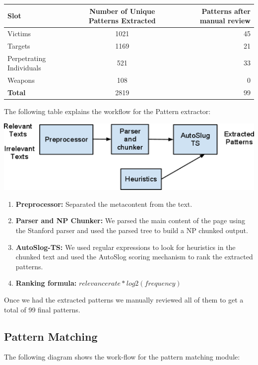\documentclass[11pt]{myclass}
\begin{document}
\begin{tabular}{| l | c | r |}
  \hline
  \textbf{Slot} & \textbf{Number of Unique Patterns Extracted} & \textbf{Patterns after manual review} \\
  \hline
  Victims & 1021 & 45 \\
  \hline
  Targets & 1169 & 21 \\
  \hline
  Perpetrating Individuals & 521 & 33 \\
  \hline
  Weapons & 108 & 0 \\
  \hline
  \textbf{Total} & 2819 & 99 \\
  \hline
\end{tabular}

The following table explains the workflow for the Pattern extractor:

\includegraphics[scale=0.75]{workflow.png}

\begin{enumerate}

\item \textbf{Preprocessor:} Separated the metacontent from the text.
\item \textbf{Parser and NP Chunker:} We parsed the main content of the page using the Stanford parser and used the parsed tree to build a NP chunked output. 
\item \textbf{AutoSlog-TS:} We used regular expressions to look for heuristics in the chunked text and used the AutoSlog scoring mechanism to rank the extracted patterns.  
\item \textbf{Ranking formula:} $relevance rate * log2(frequency)$

\end{enumerate}

Once we had the extracted patterns we manually reviewed all of them to get a total of 99 final patterns.

\subsection*{Pattern Matching}

The following diagram shows the work-flow for the pattern matching module:
\end{document}

